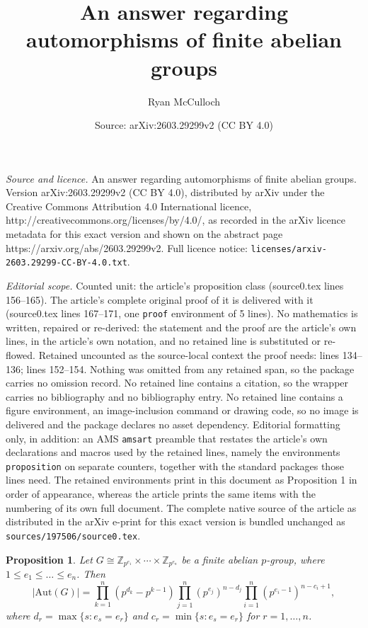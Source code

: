 \documentclass[10pt,a4paper]{amsart}
\title{An answer regarding automorphisms of finite abelian groups}
\author{Ryan McCulloch}
\date{Source: arXiv:2603.29299v2 (CC BY 4.0)}
\newtheorem{proposition}{Proposition}
\begin{document}
\maketitle

\noindent\emph{Source and licence.} An answer regarding automorphisms of finite abelian groups. Version arXiv:2603.29299v2 (CC BY 4.0), distributed by arXiv under the Creative Commons Attribution 4.0 International licence, http://creativecommons.org/licenses/by/4.0/, as recorded in the arXiv licence metadata for this exact version and shown on the abstract page https://arxiv.org/abs/2603.29299v2. Full licence notice: \texttt{licenses/arxiv-2603.29299-CC-BY-4.0.txt}.\par\smallskip

\noindent\textit{Editorial scope.} Counted unit: the article's proposition class (source0.tex lines 156--165). The article's complete original proof of it is delivered with it (source0.tex lines 167--171, one \texttt{proof} environment of 5 lines). No mathematics is written, repaired or re-derived: the statement and the proof are the article's own lines, in the article's own notation, and no retained line is substituted or re-flowed.  Retained uncounted as the source-local context the proof needs: lines 134--136; lines 152--154.  Nothing was omitted from any retained span, so the package carries no omission record.  No retained line contains a citation, so the wrapper carries no bibliography and no bibliography entry.  No retained line contains a figure environment, an image-inclusion command or drawing code, so no image is delivered and the package declares no asset dependency.  Editorial formatting only, in addition: an AMS \texttt{amsart} preamble that restates the article's own declarations and macros used by the retained lines, namely the environments \texttt{proposition} on separate counters, together with the standard packages those lines need.  The retained environments print in this document as Proposition 1 in order of appearance, whereas the article prints the same items with the numbering of its own full document.  The complete native source of the article as distributed in the arXiv e-print for this exact version is bundled unchanged as \texttt{sources/197506/source0.tex}.
\begin{proposition}\label{prop: form}
Let $G \cong \mathbb{Z}_{p^{e_1}} \times \cdots \times \mathbb{Z}_{p^{e_n}}$ be a finite abelian $p$-group, where $1 \leq e_1 \leq \dots \leq e_n$.  Then $$|\mathrm{Aut}(G)| = \prod_{k=1}^{n} (p^{d_k} - p^{k-1}) \prod_{j=1}^{n} (p^{e_j})^{n-d_j} \prod_{i=1}^{n} (p^{e_i-1})^{n-c_i+1},$$ where $d_r = \max\{s: e_s = e_r\}$ and $c_r = \min\{s: e_s = e_r\}$ for $r = 1, \dots, n$.
\end{proposition}
\end{document}
